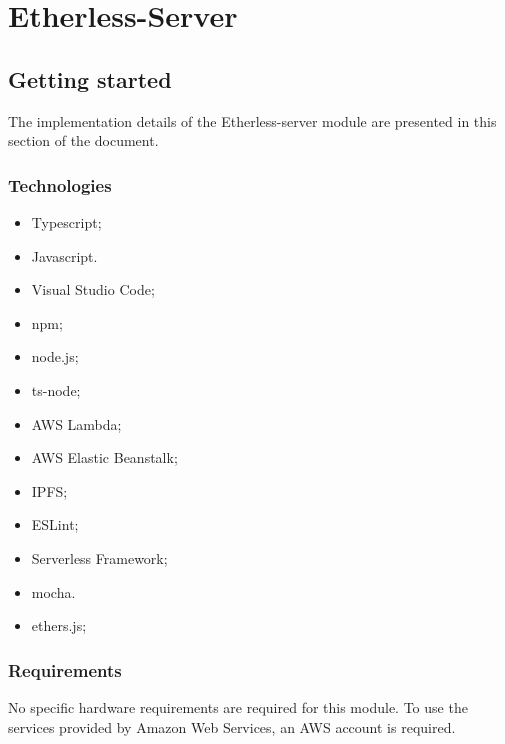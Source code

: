 \section{Etherless-Server}
	
	\subsection{Getting started}
		The implementation details of the Etherless-server module are presented in this section of the document.
	
		\subsubsection{Technologies} %
				\begin{itemize}
					\item Typescript; 
					\item Javascript.
				\end{itemize}
				\begin{itemize}
					\item Visual Studio Code;
					\item npm; 
					\item node.js;
					\item ts-node;
					\item AWS Lambda;
					\item AWS Elastic Beanstalk;
					\item IPFS;
					\item ESLint;
					\item Serverless Framework;
					\item mocha.
				\end{itemize}
				\begin{itemize}
					\item ethers.js;
				\end{itemize}
		
		\subsubsection{Requirements} %
				No specific hardware requirements are required for this module.
				To use the services provided by Amazon Web Services, an AWS account is required.
		
